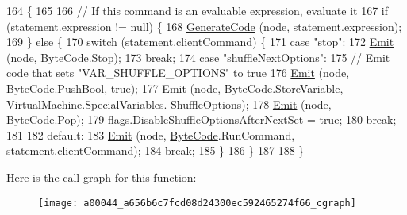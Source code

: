 \begin{DoxyCode}
164                                                                      \{
165 
166             \textcolor{comment}{// If this command is an evaluable expression, evaluate it}
167             \textcolor{keywordflow}{if} (statement.expression != null) \{
168                 \hyperlink{a00044_a006f3becd521cc179ba3d3352f6f930b}{GenerateCode} (node, statement.expression);
169             \} \textcolor{keywordflow}{else} \{
170                 \textcolor{keywordflow}{switch} (statement.clientCommand) \{
171                 \textcolor{keywordflow}{case} \textcolor{stringliteral}{"stop"}:
172                     \hyperlink{a00044_a774e8c143cdda0584fcfdda98626a83c}{Emit} (node, \hyperlink{a00041_ad5dfb6ee68ca7469623ad3e459f98894}{ByteCode}.Stop);
173                     \textcolor{keywordflow}{break};
174                 \textcolor{keywordflow}{case} \textcolor{stringliteral}{"shuffleNextOptions"}:
175                     \textcolor{comment}{// Emit code that sets "VAR\_SHUFFLE\_OPTIONS" to true}
176                     \hyperlink{a00044_a774e8c143cdda0584fcfdda98626a83c}{Emit} (node, \hyperlink{a00041_ad5dfb6ee68ca7469623ad3e459f98894}{ByteCode}.PushBool, \textcolor{keyword}{true});
177                     \hyperlink{a00044_a774e8c143cdda0584fcfdda98626a83c}{Emit} (node, \hyperlink{a00041_ad5dfb6ee68ca7469623ad3e459f98894}{ByteCode}.StoreVariable, VirtualMachine.SpecialVariables.
      ShuffleOptions);
178                     \hyperlink{a00044_a774e8c143cdda0584fcfdda98626a83c}{Emit} (node, \hyperlink{a00041_ad5dfb6ee68ca7469623ad3e459f98894}{ByteCode}.Pop);
179                     flags.DisableShuffleOptionsAfterNextSet = \textcolor{keyword}{true};
180                     \textcolor{keywordflow}{break};
181 
182                 \textcolor{keywordflow}{default}:
183                     \hyperlink{a00044_a774e8c143cdda0584fcfdda98626a83c}{Emit} (node, \hyperlink{a00041_ad5dfb6ee68ca7469623ad3e459f98894}{ByteCode}.RunCommand, statement.clientCommand);
184                     \textcolor{keywordflow}{break};
185                 \}
186             \}
187 
188         \}
\end{DoxyCode}


Here is the call graph for this function\-:
\nopagebreak
\begin{figure}[H]
\begin{center}
\leavevmode
\texttt{[image: a00044\_a656b6c7fcd08d24300ec592465274f66\_cgraph]}
\end{center}
\end{figure}


